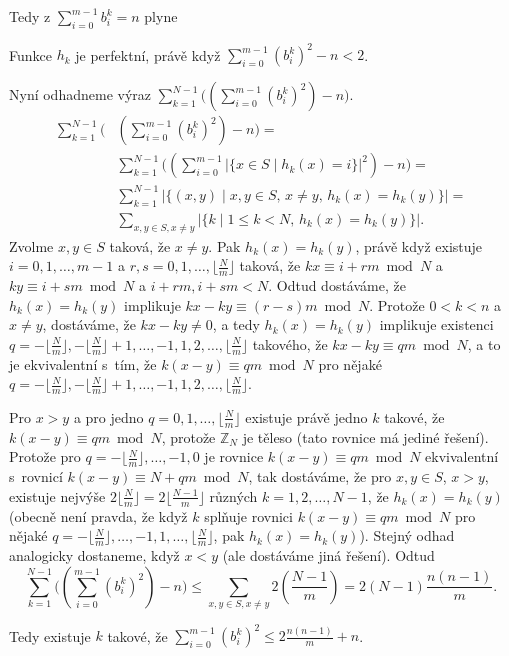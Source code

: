 \documentclass[a4paper,12pt]{article}
\begin{document}
Tedy z $\sum_{i=0}^{m-1}b_i^k=n$ plyne 

\begin{veta}Funkce $h_k$ je perfektní, právě když 
$\sum_{i=0}^{m-1}(b_i^k)^2-n<2$.
\end{veta}

Nyní odhadneme výraz $\sum_{k=1}^{N-1}\big((\sum_{
i=0}^{m-1}(b_i^k)^2)-n\big)$.
\begin{align*}\sum_{k=1}^{N-1}\big(&(\sum_{i=0}^{m-1}(b_i^k)^2)-n\big)=\\
&\sum_{k=1}^{N-1}\big((\sum_{i=0}^{m-1}|\{x\in S\mid h_k(x)=i\}|^
2)-n\big)=\\
&\sum_{k=1}^{N-1}|\{(x,y)\mid x,y\in S,\,x\ne y,\,h_k(x)=h_k(y)\}
|=\\
&\sum_{x,y\in S,x\ne y}|\{k\mid 1\le k<N,\,h_k(x)=h_k(y)\}|.\end{align*}
Zvolme $x,y\in S$ taková, že $x\ne y$. Pak $h_k(x)=h_k(y)$, 
právě když existuje $i=0,1,\dots,m-1$ a $r,s=0,1,\dots,\lfloor\frac 
Nm\rfloor$ 
taková, že $kx\equiv i+rm\bmod N$ a $ky\equiv i+sm\bmod N$ a $
i+rm,i+sm<N$. Odtud dostáváme, že $h_k(x)=h_k(y)$ implikuje $
kx-ky\equiv (r-s)m\bmod N$.
Protože $0<k<n$ a $x\ne y$, dostáváme, že $kx-ky\ne 0$, a tedy 
$h_k(x)=h_k(y)$ implikuje existenci 
$q=-\lfloor\frac Nm\rfloor ,-\lfloor\frac Nm\rfloor +1,\dots,-1,1
,2,\dots,\lfloor\frac Nm\rfloor$ takového, že 
$kx-ky\equiv qm\bmod N$,
a to je 
ekvivalentní s~tím, že $k(x-y)\equiv qm\bmod N$ pro nějaké 
$q=-\lfloor\frac Nm\rfloor ,-\lfloor\frac Nm\rfloor +1,\dots,-1,1
,2,\dots,\lfloor\frac Nm\rfloor$.

Pro $x>y$ a pro jedno $q=0,1,\dots,\lfloor\frac Nm\rfloor$ e\-xis\-tuje 
právě jedno $k$ takové, že $k(x-y)\equiv qm\bmod N$, protože 
$\mathbb Z_N$ je těleso (tato rovnice má jediné řešení). 
Protože pro $q=-\lfloor\frac Nm\rfloor ,\dots,-1,0$ je rovnice $
k(x-y)\equiv qm\bmod N$ 
ekvivalentní s~rovnicí $k(x-y)\equiv N+qm\bmod N$, tak 
dostáváme, že pro $x,y\in S$, $x>y$, existuje nejvýše 
$2\lfloor\frac Nm\rfloor =2\lfloor\frac {N-1}m\rfloor$ různých $
k=1,2,\dots,N-1$, že $h_k(x)=h_k(y)$ (obecně není pravda, že když 
$k$ splňuje rovnici $k(x-y)\equiv qm\bmod N$ pro nějaké 
$q=-\lfloor\frac Nm\rfloor ,\dots,-1,1,\dots,\lfloor\frac Nm\rfloor$, 
pak $h_k(x)=h_k(y)$). Stejný odhad analogicky dostaneme, když $
x<y$ 
(ale dostáváme jiná řešení). Odtud 
$$\sum_{k=1}^{N-1}\big((\sum_{i=0}^{m-1}(b_i^k)^2)-n\big)\le\sum_{
x,y\in S,x\ne y}2(\frac {N-1}m)=2(N-1)\frac {n(n-1)}m.$$

Tedy existuje $k$ takové, že $\sum_{i=0}^{m-1}(b_i^
k)^2\le 2\frac {n(n-1)}m+n$. 
\end{document}
